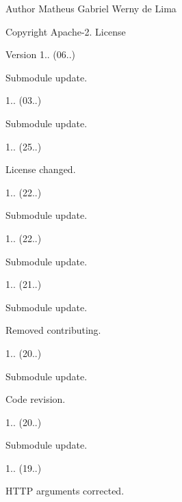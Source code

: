 \begin{DoxyAuthor}{Author}
Matheus Gabriel Werny de Lima 
\end{DoxyAuthor}
\begin{DoxyCopyright}{Copyright}
Apache-\/2. License 
\end{DoxyCopyright}
\begin{DoxyVersion}{Version}
1.. (06..)
\begin{DoxyItemize}
\item Submodule update. 
\end{DoxyItemize}

1.. (03..)
\begin{DoxyItemize}
\item Submodule update. 
\end{DoxyItemize}

1.. (25..)
\begin{DoxyItemize}
\item License changed. 
\end{DoxyItemize}

1.. (22..)
\begin{DoxyItemize}
\item Submodule update. 
\end{DoxyItemize}

1.. (22..)
\begin{DoxyItemize}
\item Submodule update. 
\end{DoxyItemize}

1.. (21..)
\begin{DoxyItemize}
\item Submodule update.
\item Removed contributing. 
\end{DoxyItemize}

1.. (20..)
\begin{DoxyItemize}
\item Submodule update.
\item Code revision. 
\end{DoxyItemize}

1.. (20..)
\begin{DoxyItemize}
\item Submodule update. 
\end{DoxyItemize}

1.. (19..)
\begin{DoxyItemize}
\item H\+T\+TP arguments corrected. 
\end{DoxyItemize}


\end{DoxyVersion}
